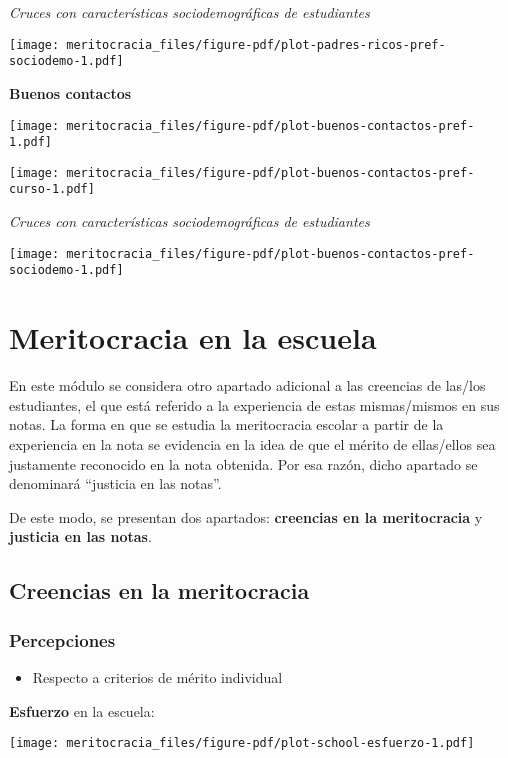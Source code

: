 \documentclass[
  letterpaper,
  DIV=11,
  numbers=noendperiod]{scrreprt}
\providecommand{\tightlist}{%
  \setlength{\itemsep}{0pt}\setlength{\parskip}{0pt}}\usepackage{longtable,booktabs,array}
\begin{document}
\emph{Cruces con características sociodemográficas de estudiantes}

\texttt{[image: meritocracia\_files/figure-pdf/plot-padres-ricos-pref-sociodemo-1.pdf]}

\textbf{Buenos contactos}

\texttt{[image: meritocracia\_files/figure-pdf/plot-buenos-contactos-pref-1.pdf]}

\texttt{[image: meritocracia\_files/figure-pdf/plot-buenos-contactos-pref-curso-1.pdf]}

\emph{Cruces con características sociodemográficas de estudiantes}

\texttt{[image: meritocracia\_files/figure-pdf/plot-buenos-contactos-pref-sociodemo-1.pdf]}

\section{Meritocracia en la escuela}\label{meritocracia-en-la-escuela}

En este módulo se considera otro apartado adicional a las creencias de
las/los estudiantes, el que está referido a la experiencia de estas
mismas/mismos en sus notas. La forma en que se estudia la meritocracia
escolar a partir de la experiencia en la nota se evidencia en la idea de
que el mérito de ellas/ellos sea justamente reconocido en la nota
obtenida. Por esa razón, dicho apartado se denominará ``justicia en las
notas''.

De este modo, se presentan dos apartados: \textbf{creencias en la
meritocracia} y \textbf{justicia en las notas}.

\subsection{Creencias en la
meritocracia}\label{creencias-en-la-meritocracia-1}

\subsubsection{Percepciones}\label{percepciones-1}

\begin{itemize}
\tightlist
\item
  Respecto a criterios de mérito individual
\end{itemize}

\textbf{Esfuerzo} en la escuela:

\texttt{[image: meritocracia\_files/figure-pdf/plot-school-esfuerzo-1.pdf]}
\end{document}
